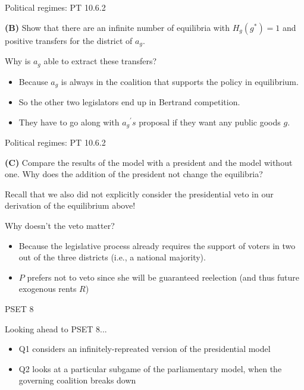 \documentclass[11pt,aspectratio=169]{beamer}
\begin{document}
\begin{frame}{Political regimes: PT 10.6.2}

\begin{tcolorbox}
\textbf{(B)} Show that there are an infinite number of equilibria with $H_g(g^*) = 1$ and positive transfers for the district of $a_g$.
\end{tcolorbox}

\alert{Why is $a_g$ able to extract these transfers? }

\pause


\begin{itemize}
\item Because $a_g$ is always in the coalition that supports the policy in equilibrium.
\item So the other two legislators end up in Bertrand competition.
\item They have to go along with ${a_{g}}^\prime s$ proposal if they want any public goods $g$.
\end{itemize}

 \end{frame}
 
\begin{frame}{Political regimes: PT 10.6.2}

\begin{tcolorbox}
\textbf{(C)} Compare the results of the model with a president and the model without one. Why does the addition of the president not change the equilibria?
\end{tcolorbox}


Recall that we also did not explicitly consider the presidential veto in our derivation of the equilibrium above!  \pause 

\alert{Why doesn't the veto matter?} \pause 

\begin{itemize}
\item Because the legislative process already requires the support of voters in two out of the three districts (i.e., a national majority). 
\item $P$ prefers not to veto since she will be guaranteed reelection (and thus future exogenous rents $R$)
\end{itemize} 

\end{frame}
 
 
 \begin{frame}{PSET 8}
 
 Looking ahead to \alert{PSET 8}...
 
 \begin{itemize}
 \item Q1 considers an infinitely-repreated version of the presidential model 
 \item Q2 looks at a particular subgame of the parliamentary model, when the governing coalition breaks down
 \end{itemize}
 
 \end{frame}
 
\end{document}
